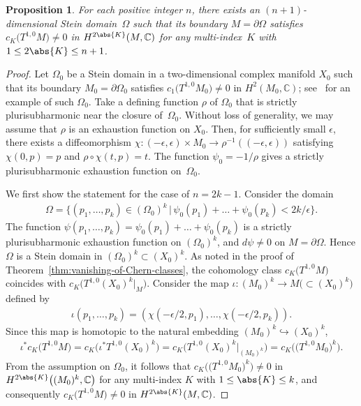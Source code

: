 \documentclass[pdftex]{sigma}
\numberwithin{equation}{section}
\newtheorem{Proposition}[Theorem]{Proposition}
 { \theoremstyle{definition}
\newtheorem{Remark}[Theorem]{Remark} }
\begin{document}
\begin{Proposition} \label{prop:optimal-degree}For each positive integer $n$, there exists an $(n + 1)$-dimensional Stein domain~$\Omega$ such that its boundary $M = \partial \Omega$ satisfies $c_{K}\big(T^{1,0}M\big) \neq 0$ in $H^{2 \abs{K}}(M, \mathbb{C})$ for any multi-index~$K$ with $1 \leq 2 \abs{K} \leq n + 1$.
\end{Proposition}

\begin{proof}Let $\Omega_{0}$ be a Stein domain in a two-dimensional complex manifold $X_{0}$ such that its boundary $M_{0} = \partial \Omega_{0}$ satisfies $c_{1}\big(T^{1, 0} M_{0}\big) \neq 0$ in $H^{2}(M_{0}, \mathbb{C})$; see~\cite[Theorem~6.2]{Etnyre-Ozbagci08} for an example of such $\Omega_{0}$. Take a defining function $\rho$ of $\Omega_{0}$ that is strictly plurisubharmonic near the closure of~$\Omega_{0}$. Without loss of generality, we may assume that $\rho$ is an exhaustion function on $X_{0}$. Then, for sufficiently small $\epsilon$, there exists a diffeomorphism $\chi \colon (- \epsilon, \epsilon) \times M_{0} \to \rho^{- 1}((- \epsilon, \epsilon))$ satisfying $\chi(0, p) = p$ and $\rho \circ \chi (t, p) = t$. The function $\psi_{0} = - 1 / \rho$ gives a strictly plurisubharmonic exhaustion function on~$\Omega_{0}$.

We first show the statement for the case of $n = 2 k - 1$. Consider the domain
\begin{gather*}
\Omega= \big\{(p_{1}, \dots , p_{k}) \in (\Omega_{0})^{k} \,|\, \psi_{0}(p_{1}) + \dots + \psi_{0}(p_{k}) < 2 k / \epsilon \big\}.
\end{gather*}
The function $\psi(p_{1}, \dots , p_{k}) = \psi_{0}(p_{1}) + \dots + \psi_{0}(p_{k})$ is a strictly plurisubharmonic exhaustion function on $(\Omega_{0})^{k}$, and $d \psi \neq 0$ on $M = \partial \Omega$. Hence $\Omega$ is a Stein domain in $(\Omega_{0})^{k} \subset (X_{0})^{k}$. As noted in the proof of Theorem~\ref{thm:vanishing-of-Chern-classes}, the cohomology class $c_{K}\big(T^{1,0}M\big)$ coincides with $c_{K}\big(T^{1, 0} (X_{0})^{k} |_{M}\big)$. Consider the map $\iota \colon (M_{0})^{k} \to M \big({\subset} (X_{0})^{k}\big)$ defined by
\begin{gather*}
\iota(p_{1}, \dots , p_{k})= (\chi(- \epsilon / 2, p_{1}), \dots , \chi(- \epsilon / 2, p_{k})).
\end{gather*}
Since this map is homotopic to the natural embedding $(M_{0})^{k} \hookrightarrow (X_{0})^{k}$,
\begin{gather*}
\iota^{*} c_{K}\big(T^{1,0}M\big)= c_{K}\big(\iota^{*} T^{1, 0} (X_{0})^{k}\big)= c_{K}\big(T^{1, 0} (X_{0})^{k} |_{(M_{0})^{k}}\big)= c_{K}\big(\big(T^{1, 0} M_{0}\big)^{k}\big).
\end{gather*}
From the assumption on $\Omega_{0}$, it follows that $c_{K}\big(\big(T^{1, 0} M_{0}\big)^{k}\big) \neq 0$ in $H^{2 \abs{K}}\big((M_{0})^{k}, \mathbb{C}\big)$ for any multi-index $K$ with $1 \leq \abs{K} \leq k$, and consequently $c_{K}\big(T^{1,0}M\big) \neq 0$ in $H^{2 \abs{K}}(M, \mathbb{C})$.


\end{proof}
\end{document}

